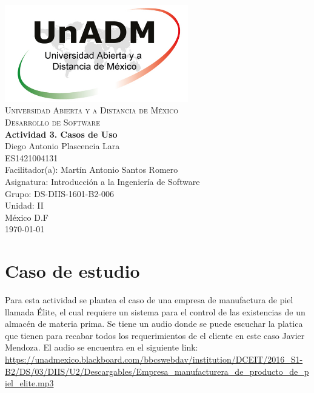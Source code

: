 \documentclass[spanish,12pt,letterpapper]{article}
\begin{document}
	\begin{titlepage}
		\begin{center}
			\includegraphics[width=0.6\textwidth]{../logoUnADM}~\\[1cm] 
			\textsc{Universidad Abierta y a Distancia de México}\\[0.8cm]
			\textsc{Desarrollo de Software}\\[1.8cm]
			
			\textbf{ \Large Actividad 3. Casos de Uso}\\[3cm]
			
			Diego Antonio Plascencia Lara\\ ES1421004131 \\[0.4cm]
			Facilitador(a): Martín Antonio Santos Romero\\
			Asignatura: Introducción a la Ingeniería de Software\\
			Grupo: DS-DIIS-1601-B2-006 \\
			Unidad: II \\
			
			\vfill México D.F\\{\today}
			
		\end{center}
	\end{titlepage}
	
	\section{Caso de estudio}
	Para esta actividad se plantea el caso de una empresa de manufactura de piel llamada Élite, el cual requiere un sistema para el control de las existencias de un almacén de materia prima. Se tiene un audio donde se puede escuchar la platica que tienen para recabar todos los requerimientos de el cliente en este caso Javier Mendoza. El audio se encuentra en el siguiente link:\\
	\url{https://unadmexico.blackboard.com/bbcswebdav/institution/DCEIT/2016_S1-B2/DS/03/DIIS/U2/Descargables/Empresa_manufacturera_de_producto_de_piel_elite.mp3}
	
\end{document}
